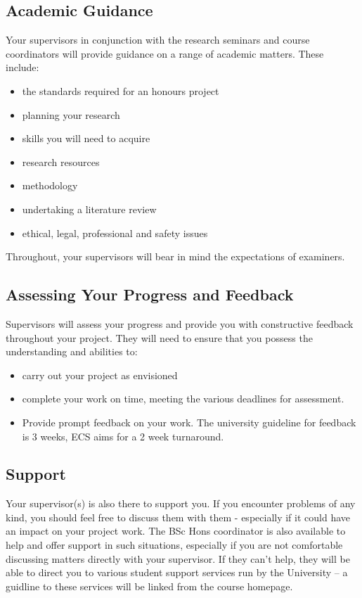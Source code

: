 \subsection{Academic Guidance}

Your supervisors in conjunction with the research seminars and course coordinators 
will provide guidance on a range of academic matters. These include:

\begin{itemize}
\item the standards required for an honours project
\item planning your research
\item skills you will need to acquire
\item research resources
\item methodology
\item undertaking a literature review
\item ethical, legal, professional and safety issues
\end{itemize}

Throughout, your supervisors will bear in mind the expectations of examiners.

\subsection{Assessing Your Progress and Feedback}

Supervisors will assess your progress and provide you with constructive feedback throughout your project. 
They will need to ensure that you possess the understanding and abilities to:

\begin{itemize}
\item carry out your project as envisioned
\item complete your work on time, meeting the various deadlines for assessment.
\item Provide prompt feedback on your work.  The university guideline
  for feedback is 3 weeks, ECS aims for a 2 week turnaround.
\end{itemize}

\subsection{Support}

Your supervisor(s) is also there to support you. If you encounter
problems of any kind, you should feel free to discuss them with them -
especially if it could have an impact on your project work.  The BSc Hons 
coordinator is also available to help and offer support in such
situations, especially if you are not comfortable discussing matters
directly with your supervisor.  If they can't help, they will be able
to direct you to various student support services run by the
University -- a guidline to these services will be linked from the
course homepage.

